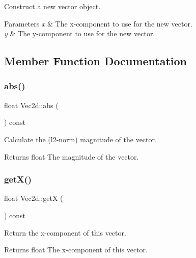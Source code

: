 Construct a new vector object. 


\begin{DoxyParams}{Parameters}
{\em x} & The x-\/component to use for the new vector. \\
\hline
{\em y} & The y-\/component to use for the new vector. \\
\hline
\end{DoxyParams}


\subsection{Member Function Documentation}
\mbox{\label{classVec2d_ad0274969d040d25e35fe25759b32181f}} 
\subsubsection{\texorpdfstring{abs()}{abs()}}
{\footnotesize\ttfamily float Vec2d\+::abs (\begin{DoxyParamCaption}{ }\end{DoxyParamCaption}) const}



Calculate the (l2-\/norm) magnitude of the vector. 

\begin{DoxyReturn}{Returns}
float The magnitude of the vector. 
\end{DoxyReturn}
\mbox{\label{classVec2d_a20c3d6a967bebbd21690da5b29baa7df}} 
\subsubsection{\texorpdfstring{get\+X()}{getX()}}
{\footnotesize\ttfamily float Vec2d\+::getX (\begin{DoxyParamCaption}{ }\end{DoxyParamCaption}) const}



Return the x-\/component of this vector. 

\begin{DoxyReturn}{Returns}
float The x-\/component of this vector. 
\end{DoxyReturn}
\mbox{\label{classVec2d_a9c3408a01420fdd3fe9011810203dc7b}} 
